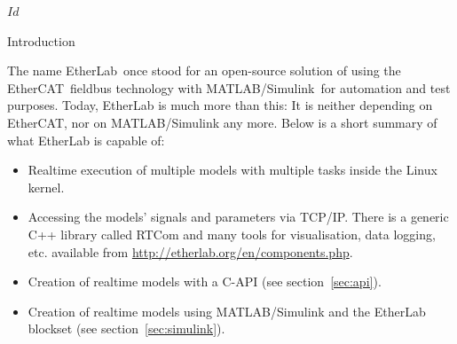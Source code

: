 
\SVN $Id$
\rfoot{\SVNId}

\begin{ighsec}{Introduction}
\label{sec:intro}

The name EtherLab\regTM\ once stood for an open-source solution of using the
EtherCAT\regTM\ fieldbus technology with MATLAB/Simulink\regTM\ for automation
and test purposes. Today, EtherLab is much more than this: It is neither
depending on EtherCAT, nor on MATLAB/Simulink any more. Below is a short
summary of what EtherLab is capable of:

\begin{itemize}

\item Realtime execution of multiple models with multiple tasks inside the
Linux kernel.

\item Accessing the models' signals and parameters via TCP/IP. There is a
generic C++ library called RTCom and many tools for visualisation, data
logging, etc. available from \url{http://etherlab.org/en/components.php}.

\item Creation of realtime models with a C-API (see section~\ref{sec:api}).

\item Creation of realtime models using MATLAB/Simulink and the EtherLab
blockset (see section~\ref{sec:simulink}).

\end{itemize}

\end{ighsec}


